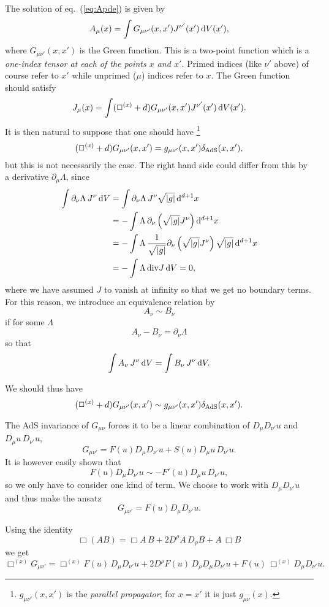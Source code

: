 The solution of eq.~(\ref{eq:Apde}) is given by
$$A_\mu(x) = \int G_{\mu\nu'}(x,x') J^{\nu'}(x')\, \mathrm{d} V(x'),$$
where $G_{\mu\nu'}(x,x')$ is the Green function. This is a two-point function which is a \emph{one-index tensor at each of the points $x$ and $x'$.} Primed indices (like $\nu'$ above) of course refer to $x'$ while unprimed ($\mu$) indices refer to $x$. The Green function should satisfy
$$J_\mu(x) = \int (\Box^{(x)} + d)G_{\mu\nu'}(x,x') J^{\nu'}(x')\, \mathrm{d} V(x').$$
It is then natural to suppose that one should have \footnote{$g_{\mu\nu'}(x,x')$ is the \emph{parallel propagator}; for $x=x'$ it is just $g_{\mu\nu}(x)$.}
$$(\Box^{(x)} + d)G_{\mu\nu'}(x,x') = g_{\mu\nu'}(x,x') \delta_{\mathrm{AdS}}(x,x'),$$
but this is not necessarily the case. The right hand side could differ from this by a derivative $\partial_\mu \Lambda$, since
\begin{equation}\label{eq:equivgnd}
\begin{split}
\int \partial_\nu \Lambda\, J^\nu\, \mathrm{d} V &= \int \partial_\nu \Lambda\, J^\nu \sqrt{|g|}\, \mathrm{d}^{d+1}x \\
&= -\int \Lambda\, \partial_\nu \left(\sqrt{|g|} J^\nu\right) \mathrm{d}^{d+1}x \\
&= -\int \Lambda\, \frac{1}{\sqrt{|g|}} \partial_\nu \left( \sqrt{|g|} J^\nu \right) \sqrt{|g|}\, \mathrm{d}^{d+1}x \\
&= -\int \Lambda\, \mathrm{div} J\, \mathrm{d} V = 0,
\end{split}
\end{equation}
where we have assumed $J$ to vanish at infinity so that we get no boundary terms.
For this reason, we introduce an equivalence relation by
$$A_\nu \sim B_\nu$$
if for some $\Lambda$
$$A_\nu - B_\nu = \partial_\nu \Lambda$$
so that
$$\int A_\nu\, J^\nu\, \mathrm{d} V = \int B_\nu\, J^\nu\, \mathrm{d} V.$$

We should thus have
\begin{equation}\label{eq:Gpde}
(\Box^{(x)} + d)G_{\mu\nu'}(x,x') \sim g_{\mu\nu'}(x,x') \delta_{\mathrm{AdS}}(x,x').
\end{equation}

The AdS invariance of $G_{\mu\nu}$ forces it to be a linear combination of
$D_\mu D_{\nu'} u$ and $D_\mu u\,  D_{\nu'} u$,
$$G_{\mu\nu'} = F(u) D_\mu D_{\nu'} u + S(u) D_\mu u\, D_{\nu'}u.$$
It is however easily shown that
$$F(u) D_\mu D_{\nu'} u \sim - F'(u) D_\mu u\, D_{\nu'}u,$$
so we only have to consider one kind of term. We choose to work with $D_\mu D_{\nu'} u$ and thus make the ansatz
$$G_{\mu\nu'} = F(u) D_\mu D_{\nu'} u.$$

Using the identity
$$\Box \left( A B \right) = \Box A\, B + 2 D^\rho A\, D_\rho B + A\, \Box B$$
we get
\begin{equation}\label{eq:boxG}
\Box^{(x)}G_{\mu\nu'} = \Box^{(x)} F(u)\, D_\mu D_{\nu'} u + 2 D^\rho F(u)\, D_\rho D_\mu D_{\nu'} u + F(u)\, \Box^{(x)} D_\mu D_{\nu'} u.
\end{equation}

